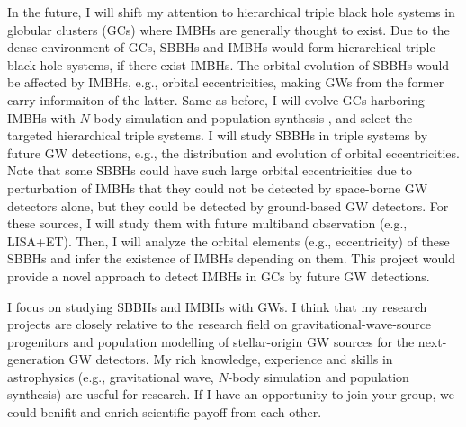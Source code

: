\documentclass[12pt,a4paper,sans]{article}%
\begin{document}
In the future, I will shift my attention to hierarchical triple black hole systems in globular clusters (GCs) where
IMBHs are generally thought to exist. Due to the dense environment of GCs, SBBHs and IMBHs would form hierarchical
triple black hole systems, if there exist IMBHs. The orbital evolution of SBBHs would be affected by IMBHs, e.g.,
orbital eccentricities, making GWs
from the former carry informaiton of the latter. Same as before, I will evolve GCs harboring IMBHs with $N$-body
simulation and population synthesis
, and select the targeted hierarchical triple systems. I will study SBBHs in triple systems by future GW detections,
e.g., the distribution and evolution of orbital
eccentricities. Note that some SBBHs could have such large orbital eccentricities due to perturbation of IMBHs that they
could not be
detected by space-borne GW detectors alone, but they could be detected by ground-based GW detectors. For these sources,
I will study them with future multiband observation (e.g., LISA+ET). Then, I will analyze the orbital elements (e.g., eccentricity) of
these SBBHs and infer the existence of IMBHs depending on them. This project would provide a novel approach to detect IMBHs in GCs by future GW detections.  

I focus on studying SBBHs and IMBHs with GWs. I think that my research projects are closely relative to the research
field on gravitational-wave-source progenitors and population modelling of stellar-origin GW sources for the
next-generation GW detectors. My rich knowledge, experience and skills in astrophysics (e.g., gravitational wave, $N$-body
simulation and population synthesis) are useful for research. If I have an opportunity to join your group, we could benifit and enrich scientific payoff from each other. 




%
\end{document}
